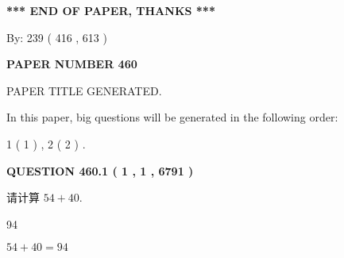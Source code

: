 \documentclass{ctexart}
\begin{document}
   
   
   
\vspace{1.0in} 
{\textbf{\large{ *** END OF PAPER, THANKS *** }}} 
   
   
\hspace{1.0in} By: 
 239 ( 416 ,  613 )
   
   
   
   
\newpage 
\setcounter{page}{ 
   460001 } 
   
   
   
   
 {\textbf{ \Large{ PAPER NUMBER  460  }}}
   
   
\vspace{0.2in}
   
   
   
   
   
   
   
   
 \vspace{0.2in}
 
 
 
 
   
   
 PAPER TITLE GENERATED.
   
   
   
\vspace{0.2in}
   
In this paper, big questions will be generated in the following order: 
   
   
   1 ( 1 )
 ,
   2 ( 2 )
 .
  
\vspace{0.2in}
  
{\textbf{\Large{QUESTION
460.1 
 ( 1 , 1 , 6791 )
}}}
  
  
 
请计算 $ %
54 +  %
40 $.
 
 
 
\noindent{}
 
 

94
 
 
\noindent{}
 
 

 
 
 
\noindent{}
 
 

$ %
54 +  %
40=   %
94$
 
\end{document}
